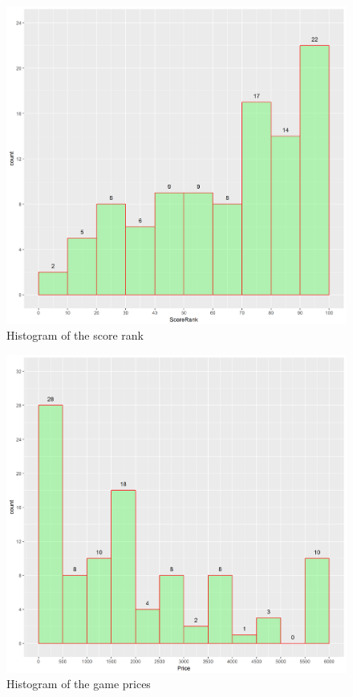 \documentclass[figures_tabs.tex]{subfiles}
\begin{document}
\begin{figure}[H]
    \centering
    \includegraphics[width=\textwidth]{img/score_rank.png}
    \caption{Histogram of the score rank}
    \label{fig:score_rank}
\end{figure}

\begin{figure}[H]
    \centering
    \includegraphics[width=\textwidth]{img/price.png}
    \caption{Histogram of the game prices}
    \label{fig:price}
\end{figure}
\end{document}
